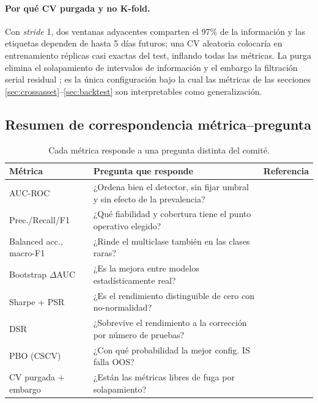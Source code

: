 \documentclass[11pt,a4paper]{article}
\begin{document}
\paragraph{Por qué CV purgada y no K-fold.} Con \emph{stride} 1, dos ventanas
adyacentes comparten el 97\% de la información y las etiquetas dependen de hasta
5 días futuros; una CV aleatoria colocaría en entrenamiento réplicas casi exactas
del test, inflando todas las métricas. La purga elimina el solapamiento de
intervalos de información y el embargo la filtración serial residual
\cite{lopezdeprado2018advances}; es la única configuración bajo la cual las
métricas de las secciones \ref{sec:crossasset}--\ref{sec:backtest} son
interpretables como generalización.

\subsection{Resumen de correspondencia métrica--pregunta}
\begin{table}[H]
\centering
\footnotesize
\caption{Cada métrica responde a una pregunta distinta del comité.}
\begin{tabularx}{\textwidth}{lXl}
\toprule
\textbf{Métrica} & \textbf{Pregunta que responde} & \textbf{Referencia} \\
\midrule
AUC-ROC & ¿Ordena bien el detector, sin fijar umbral y sin efecto de la prevalencia? & \cite{hanley1982meaning,fawcett2006introduction} \\
Prec./Recall/F1 & ¿Qué fiabilidad y cobertura tiene el punto operativo elegido? & \cite{saito2015precision,powers2011evaluation} \\
Balanced acc., macro-F1 & ¿Rinde el multiclase también en las clases raras? & \cite{brodersen2010balanced} \\
Bootstrap $\Delta$AUC & ¿Es la mejora entre modelos estadísticamente real? & \cite{efron1994introduction,delong1988comparing} \\
Sharpe + PSR & ¿Es el rendimiento distinguible de cero con no-normalidad? & \cite{sharpe1994ratio,bailey2012sharpe} \\
DSR & ¿Sobrevive el rendimiento a la corrección por número de pruebas? & \cite{bailey2014deflated,harvey2015backtesting} \\
PBO (CSCV) & ¿Con qué probabilidad la mejor config. IS falla OOS? & \cite{bailey2017probability} \\
CV purgada + embargo & ¿Están las métricas libres de fuga por solapamiento? & \cite{lopezdeprado2018advances} \\
\bottomrule
\end{tabularx}
\end{table}
\end{document}
